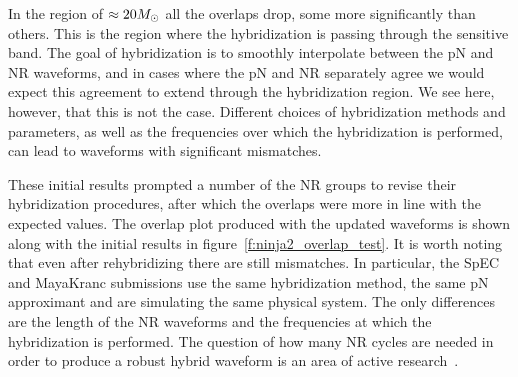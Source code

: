 In the region of $\approx 20 M_\odot$ all the overlaps drop, some more
significantly than others.  This is the region where the hybridization
is passing through the sensitive band.  The goal of
hybridization is to smoothly interpolate between the pN and NR
waveforms, and in cases where the pN and NR separately agree we would
expect this agreement to extend through the hybridization region.  We
see here, however, that this is not the case.  Different choices of
hybridization methods and parameters, as well as the frequencies over
which the hybridization is performed, can lead to waveforms with
significant mismatches.  

These initial results prompted a number of the NR groups to revise
their hybridization procedures, after which the overlaps were more in
line with the expected values.  The overlap plot produced with the
updated waveforms is shown along with the initial results in
figure~\ref{f:ninja2_overlap_test}.  It is worth noting that even
after rehybridizing there are still mismatches.  In particular, the
SpEC and MayaKranc submissions use the same hybridization method, the
same pN approximant and are simulating the same physical system.  The
only differences are the length of the NR waveforms and the
frequencies at which the hybridization is performed.  The question of
how many NR cycles are needed in order to produce a robust hybrid
waveform is an area of active research~\cite{MacDonald:2011}. 


